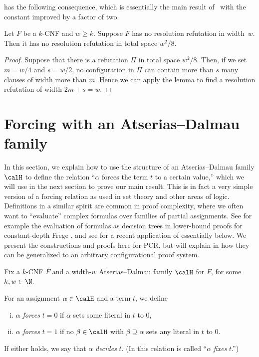 \documentclass{toc}
\begin{document}
 has the following consequence, which is essentially
the main result of~\cite{DBLP:conf/icalp/Bonacina16} with 
the constant improved by a factor of two.


\begin{corollary}
\label{cor:Bon}
Let $F$ be a $k$-CNF and $w \ge k$.
Suppose $F$ has no resolution refutation in width~$w$.
Then it has no resolution refutation in total space ${w}^2/8$.
\end{corollary}

\begin{proof}
Suppose that there is a refutation $\Pi$ in total space ${w}^2/8$.
Then, if we set $m=w/4$ and $s=w/2$, no configuration in $\Pi$
can contain more than $s$ many clauses of width more than $m$.
Hence we can apply the lemma to find a resolution refutation
of width $2m+s = w$.
\end{proof}




%
\section{Forcing with an Atserias--Dalmau family}\label{sec:forcing}
%

In this section, we explain how to use the structure of an Atserias--Dalmau family $\calH$
to define the relation ``$\alpha$ forces the term $t$ to a certain value,''
which we will use in the next section to prove our main result.
This is in fact a very simple version of a forcing relation as used in  
set theory and other areas of logic. 
Definitions in a similar spirit are common in proof complexity, where we
often want to ``evaluate'' complex formulas over families of partial assignments.
See for example the evaluation of formulas as decision trees in lower-bound
proofs for constant-depth %
Frege \cite{Pitassi_PHP, Krajicek_PHP},   %
and see \cite{Pudlak2019, kolodziejczyk2018approximate} 
for a recent application of essentially  below.
We present the constructions and proofs here for PCR, but
will explain in 
how they can be generalized to an arbitrary configurational proof system.

Fix a $k$-CNF $F$ and a width-$w$ Atserias--Dalmau family $\calH$
for $F$, for some $k,w \in \N$.

\begin{definition} \label{def:fixing}
For an assignment $\alpha \in \calH$ and a term $t$, we define
\begin{enumerate}[(i)]
\item
$\alpha$ \emph{forces} $t=0$ if $\alpha$ sets some literal in $t$ to $0$,
\item
$\alpha$ \emph{forces} $t=1$ if no $\beta \in \calH$ with $\beta \supseteq \alpha$ sets any
literal in $t$ to $0$. 
\end{enumerate}
If either holds, 
we say that $\alpha$ \emph{decides} $t$.
(In \cite{conf-version,Pudlak2019} this relation is called 
``$\alpha$ \emph{fixes} $t$.'')
\end{definition}
\end{document}
